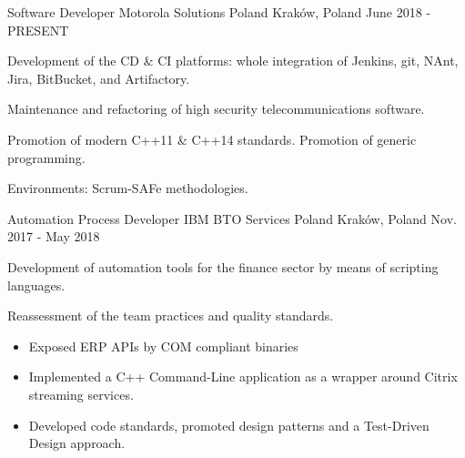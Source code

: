 
\begin{cventries}

\cventry
    {Software Developer} %
    {Motorola Solutions Poland} %
    {Kraków, Poland} %
    {June 2018 - PRESENT} %
    {
        \begin{cvitems} %
            \item {Development of the CD \& CI platforms: whole integration of Jenkins, git, NAnt, Jira, BitBucket, and Artifactory.}
            \item {Maintenance and refactoring of high security telecommunications software.}
            \item {Promotion of modern C++11 \& C++14 standards. Promotion of generic programming.}
            \item {Environments: Scrum-SAFe methodologies.}
        \end{cvitems}
    }

\cventry
    {Automation Process Developer} %
    {IBM BTO Services Poland} %
    {Kraków, Poland} %
    {Nov. 2017 - May 2018} %
    {
        \begin{cvitems} %
            \item {Development of automation tools for the finance sector by means of scripting languages.}
            \item {Reassessment of the team practices and quality standards.}
            \begin{itemize}
                \item {Exposed ERP APIs by COM compliant binaries}
                \item {Implemented a C++ Command-Line application as a wrapper around Citrix streaming services.}
                \item {Developed code standards, promoted design patterns and a Test-Driven Design approach.}
            \end{itemize}
        \end{cvitems}
    }


\end{cventries}
